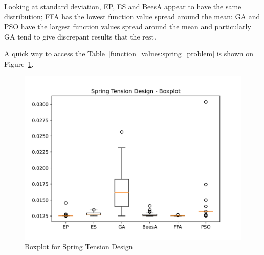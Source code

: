 \documentclass[conference]{IEEEtran}
\begin{document}
\begin{table}[H]
\centering
\caption{Statistical Information about function values for Spring Tension Design}
\label{function_values:spring_problem}
\end{table}

Looking at standard deviation, EP, ES and BeesA appear to have the same distribution;
FFA has the lowest function value spread around the mean; GA and PSO have the largest
function values spread around the mean and particularly GA tend to give discrepant results
that the rest.


A quick way to access the Table~\ref{function_values:spring_problem} is
shown on Figure~\ref{fig:spring_tension_design_boxplot}.

\begin{figure}[H]
\centering
\caption{Boxplot for Spring Tension Design}
\label{fig:spring_tension_design_boxplot}
\includegraphics[scale=0.5]{images/spring_problem_boxplot.png}
\end{figure}
\end{document}

